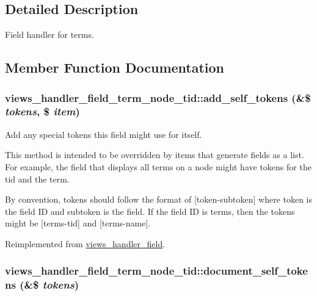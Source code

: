 \subsection{Detailed Description}
Field handler for terms. 

\subsection{Member Function Documentation}
\hypertarget{classviews__handler__field__term__node__tid_7fea3443ab075e3e35212ddc3b0d95f3}{
\subsubsection[{add\_\-self\_\-tokens}]{\setlength{\rightskip}{0pt plus 5cm}views\_\-handler\_\-field\_\-term\_\-node\_\-tid::add\_\-self\_\-tokens (\&\$ {\em tokens}, \/  \$ {\em item})}}
\label{classviews__handler__field__term__node__tid_7fea3443ab075e3e35212ddc3b0d95f3}


Add any special tokens this field might use for itself.

This method is intended to be overridden by items that generate fields as a list. For example, the field that displays all terms on a node might have tokens for the tid and the term.

By convention, tokens should follow the format of \mbox{[}token-subtoken\mbox{]} where token is the field ID and subtoken is the field. If the field ID is terms, then the tokens might be \mbox{[}terms-tid\mbox{]} and \mbox{[}terms-name\mbox{]}. 

Reimplemented from \hyperlink{classviews__handler__field_c61cc83a4c8c579993a254b5b1e16cbc}{views\_\-handler\_\-field}.\hypertarget{classviews__handler__field__term__node__tid_fa909e51eb90573d468deb29a3943d94}{
\subsubsection[{document\_\-self\_\-tokens}]{\setlength{\rightskip}{0pt plus 5cm}views\_\-handler\_\-field\_\-term\_\-node\_\-tid::document\_\-self\_\-tokens (\&\$ {\em tokens})}}
\label{classviews__handler__field__term__node__tid_fa909e51eb90573d468deb29a3943d94}



